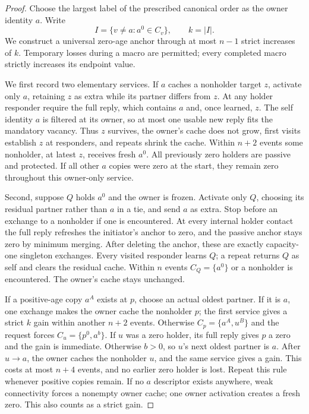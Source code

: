 \documentclass[11pt]{article}
\begin{document}
\begin{proof}
Choose the largest label of the prescribed canonical order
as the owner identity $a$. Write
\[
 I=\{v\ne a:a^0\in C_v\},\qquad k=|I|.
\]
We construct a universal zero-age anchor through at most
$n-1$ strict increases of $k$. Temporary losses during a
macro are permitted; every completed macro strictly
increases its endpoint value.

We first record two elementary services. If $a$ caches
a nonholder target $z$, activate only $a$, retaining $z$
as extra while its partner differs from $z$. At any holder
responder require the full reply, which contains $a$ and,
once learned, $z$. The self identity $a$ is filtered at
its owner, so at most one usable new reply fits the
mandatory vacancy. Thus $z$ survives, the owner's cache
does not grow, first visits establish $z$ at responders,
and repeats shrink the cache. Within $n+2$ events some
nonholder, at latest $z$, receives fresh $a^0$.
All previously zero holders are passive and protected.
If all other $a$ copies were zero at the start, they
remain zero throughout this owner-only service.

Second, suppose $Q$ holds $a^0$ and the owner is frozen.
Activate only $Q$, choosing its residual partner rather
than $a$ in a tie, and send $a$ as extra. Stop before
an exchange to a nonholder if one is encountered.
At every internal holder contact the full reply refreshes
the initiator's anchor to zero, and the passive anchor
stays zero by minimum merging. After deleting the anchor,
these are exactly capacity-one singleton exchanges.
Every visited responder learns $Q$; a repeat returns
$Q$ as self and clears the residual cache.
Within $n$ events $C_Q=\{a^0\}$ or a nonholder is
encountered. The owner's cache stays unchanged.

If a positive-age copy $a^A$ exists at $p$, choose an
actual oldest partner. If it is $a$, one exchange makes
the owner cache the nonholder $p$; the first service gives
a strict $k$ gain within another $n+2$ events.
Otherwise $C_p=\{a^A,u^B\}$ and the request forces
$C_u=\{p^0,a^b\}$. If $u$ was a zero holder, its full
reply gives $p$ a zero and the gain is immediate.
Otherwise $b>0$, so $u$'s next oldest partner is $a$.
After $u\to a$, the owner caches the nonholder $u$,
and the same service gives a gain. This costs at most
$n+4$ events, and no earlier zero holder is lost.
Repeat this rule whenever positive copies remain.
If no $a$ descriptor exists anywhere, weak connectivity
forces a nonempty owner cache; one owner activation
creates a fresh zero. This also counts as a strict gain.


\end{proof}
\end{document}
